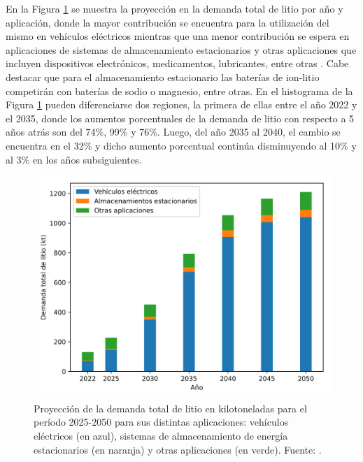 En la Figura \ref{fig:iea-Li} se muestra la proyección en la demanda total de 
litio por año y aplicación, donde la mayor contribución se encuentra para la 
utilización del mismo en vehículos eléctricos mientras que una menor contribución 
se espera en aplicaciones de sistemas de almacenamiento estacionarios y otras 
aplicaciones que incluyen dispositivos electrónicos, medicamentos, lubricantes, 
entre otras \cite{IEA}. Cabe destacar que para el almacenamiento estacionario 
las baterías de ion-litio competirán con baterías de sodio o magnesio, entre 
otras. En el histograma de la Figura \ref{fig:iea-Li} pueden diferenciarse dos 
regiones, la primera de ellas entre el año 2022 y el 2035, donde los aumentos
porcentuales de la demanda de litio con respecto a 5 años atrás son del 74\%, 
99\% y 76\%. Luego, del año 2035 al 2040, el cambio se encuentra en el 32\% y
dicho aumento porcentual continúa disminuyendo al 10\% y al 3\% en los años 
subsiguientes.
\begin{figure}[h!]
    \centering
    \includegraphics[width=.8\textwidth]{Introduccion/energia/iea-Li.png}
    \caption{Proyección de la demanda total de litio en kilotoneladas para el 
    período 2025-2050 para sus distintas aplicaciones: vehículos eléctricos (en 
    azul), sistemas de almacenamiento de energía estacionarios (en naranja) y
    otras aplicaciones (en verde). Fuente: \cite{IEA}.}
    \label{fig:iea-Li}
\end{figure}
